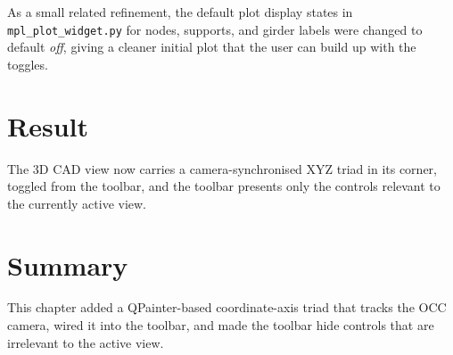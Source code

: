 As a small related refinement, the default plot display states in
\texttt{mpl\_plot\_widget.py} for nodes, supports, and girder labels were changed to default
\emph{off}, giving a cleaner initial plot that the user can build up with the toggles.

\section{Result}
The 3D CAD view now carries a camera-synchronised XYZ triad in its corner, toggled from the
toolbar, and the toolbar presents only the controls relevant to the currently active view.


\section{Summary}
This chapter added a QPainter-based coordinate-axis triad that tracks the OCC camera, wired it
into the toolbar, and made the toolbar hide controls that are irrelevant to the active view.

